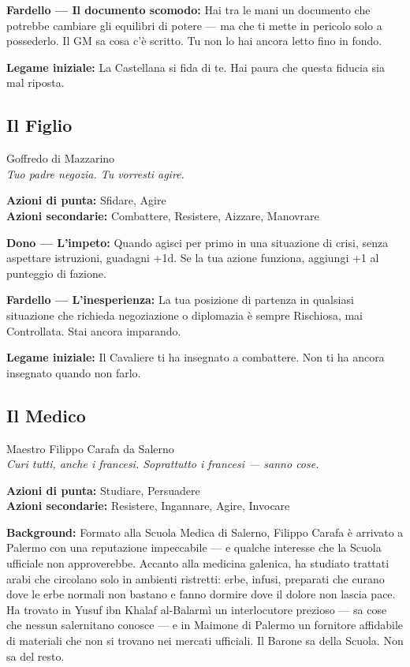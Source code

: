 \textbf{Fardello — Il documento scomodo:} Hai tra le mani un documento
che potrebbe cambiare gli equilibri di potere — ma che ti mette
in pericolo solo a possederlo. Il GM sa cosa c'è scritto. Tu non
lo hai ancora letto fino in fondo.

\textbf{Legame iniziale:} La Castellana si fida di te. Hai paura
che questa fiducia sia mal riposta.

\filetto

\subsection{Il Figlio}
{\cinzel\footnotesize\color{grigionote} Goffredo di Mazzarino}\\
\textit{Tuo padre negozia. Tu vorresti agire.}

\textbf{Azioni di punta:} Sfidare, Agire\\
\textbf{Azioni secondarie:} Combattere, Resistere, Aizzare, Manovrare

\textbf{Dono — L'impeto:} Quando agisci per primo in una situazione
di crisi, senza aspettare istruzioni, guadagni +1d. Se la tua azione
funziona, aggiungi +1 al punteggio di fazione.

\textbf{Fardello — L'inesperienza:} La tua posizione di partenza
in qualsiasi situazione che richieda negoziazione o diplomazia
è sempre Rischiosa, mai Controllata. Stai ancora imparando.

\textbf{Legame iniziale:} Il Cavaliere ti ha insegnato a combattere.
Non ti ha ancora insegnato quando non farlo.

\filetto

\subsection{Il Medico}
{\cinzel\footnotesize\color{grigionote} Maestro Filippo Carafa da Salerno}\\
\textit{Curi tutti, anche i francesi. Soprattutto i francesi — sanno cose.}

\textbf{Azioni di punta:} Studiare, Persuadere\\
\textbf{Azioni secondarie:} Resistere, Ingannare, Agire, Invocare

\textbf{Background:} Formato alla Scuola Medica di Salerno, Filippo
Carafa è arrivato a Palermo con una reputazione impeccabile — e qualche
interesse che la Scuola ufficiale non approverebbe. Accanto alla medicina
galenica, ha studiato trattati arabi che circolano solo in ambienti
ristretti: erbe, infusi, preparati che curano dove le erbe normali non
bastano e fanno dormire dove il dolore non lascia pace. Ha trovato in
Yusuf ibn Khalaf al-Balarmì un interlocutore prezioso — sa cose che
nessun salernitano conosce — e in Maimone di Palermo un fornitore
affidabile di materiali che non si trovano nei mercati ufficiali.
Il Barone sa della Scuola. Non sa del resto.

